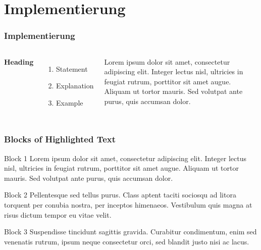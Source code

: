 \documentclass{beamer}
\begin{document}
\section{Implementierung}
\begin{frame}
\frametitle{Implementierung}
\begin{columns}[c] %

\textbf{Heading}
\begin{enumerate}
\item Statement
\item Explanation
\item Example
\end{enumerate}

Lorem ipsum dolor sit amet, consectetur adipiscing elit. Integer lectus nisl, ultricies in feugiat rutrum, porttitor sit amet augue. Aliquam ut tortor mauris. Sed volutpat ante purus, quis accumsan dolor.

\end{columns}
\end{frame}


\begin{frame}
\frametitle{Blocks of Highlighted Text}
\begin{block}{Block 1}
Lorem ipsum dolor sit amet, consectetur adipiscing elit. Integer lectus nisl, ultricies in feugiat rutrum, porttitor sit amet augue. Aliquam ut tortor mauris. Sed volutpat ante purus, quis accumsan dolor.
\end{block}

\begin{block}{Block 2}
Pellentesque sed tellus purus. Class aptent taciti sociosqu ad litora torquent per conubia nostra, per inceptos himenaeos. Vestibulum quis magna at risus dictum tempor eu vitae velit.
\end{block}

\begin{block}{Block 3}
Suspendisse tincidunt sagittis gravida. Curabitur condimentum, enim sed venenatis rutrum, ipsum neque consectetur orci, sed blandit justo nisi ac lacus.
\end{block}
\end{frame}
\end{document}
